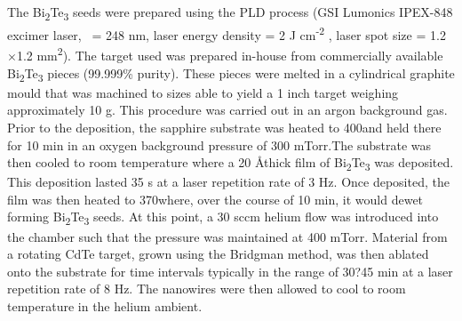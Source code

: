 The Bi\textsubscript{2}Te\textsubscript{3} seeds were prepared using the PLD process
(GSI Lumonics IPEX-848 excimer laser, \textlambda~= 248 nm, laser
energy density = 2 J cm\textsuperscript{-2} , laser spot size = 1.2$\times$1.2 mm\textsuperscript{2}).
The target used was prepared in-house from commercially
available Bi\textsubscript{2}Te\textsubscript{3} pieces (99.999\% purity). These pieces were
melted in a cylindrical graphite mould that was machined to
sizes able to yield a 1 inch target weighing approximately 10 g. This procedure was carried out in an argon background gas. Prior to the deposition, the sapphire substrate was heated to 
400\degree\celsius and held there for 10 min in an oxygen background 
pressure of 300 mTorr.The substrate was then cooled to room temperature where a 20 \AA thick film of Bi\textsubscript{2}Te\textsubscript{3} was deposited. This deposition lasted 35 s at a laser repetition rate of 3 Hz. 
Once deposited, the film was then heated to 370\degree\celsius where, over 
the course of 10 min, it would dewet forming Bi\textsubscript{2}Te\textsubscript{3} 
seeds. At this point, a 30 sccm helium flow was introduced 
into the chamber such that the pressure was maintained at 
400 mTorr. Material from a rotating CdTe target, grown using 
the Bridgman method, was then ablated onto the substrate for 
time intervals typically in the range of 30?45 min at a laser 
repetition rate of 8 Hz. The nanowires were then allowed to 
cool to room temperature in the helium ambient.

